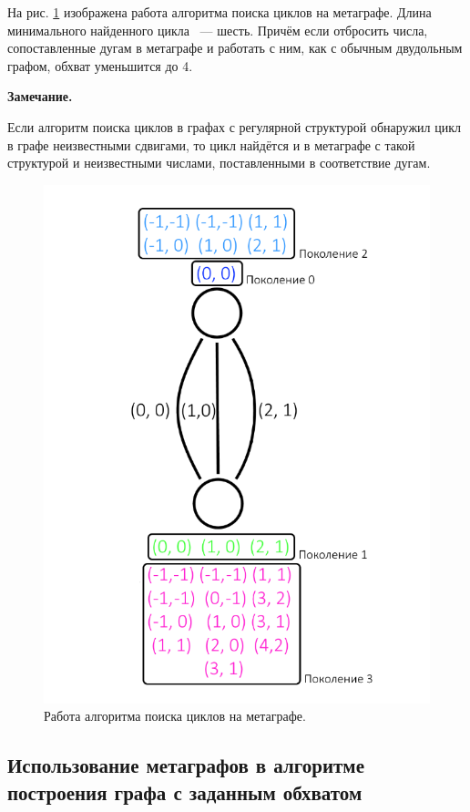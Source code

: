\documentclass[14pt]{mmcs-article}
\begin{document}
На рис. \ref{metagraph:2} изображена работа алгоритма поиска циклов на метаграфе. Длина минимального найденного цикла ~--- шесть. Причём если отбросить числа, сопоставленные дугам в метаграфе и работать с ним, как с обычным двудольным графом, обхват уменьшится до 4.

\textbf{Замечание.}

Если алгоритм поиска циклов в графах с регулярной структурой обнаружил цикл в графе неизвестными сдвигами, то цикл найдётся и в метаграфе с такой структурой и неизвестными числами, поставленными в соответствие дугам.

\begin{figure}[H]
  \centering
  \includegraphics[scale=0.5]{Fig_9.png}
  \caption{ Работа алгоритма поиска циклов на метаграфе. }
  \label{metagraph:2}
\end{figure}

\subsection{Использование метаграфов в алгоритме\\ построения графа с заданным обхватом}
\end{document}
